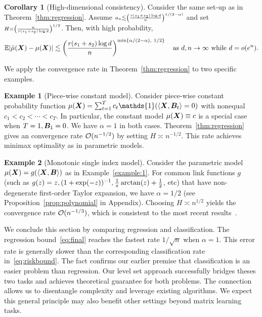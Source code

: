 \documentclass[11pt]{article}
\theoremstyle{plain}
\theoremstyle{definition}
\newtheorem{corollary}{Corollary}
\newtheorem{example}{Example}
\begin{document}
\begin{corollary}[High-dimensional consistency] Consider the same set-up as in Theorem~\ref{thm:regression}. Assume $\scriptstyle a_n \lesssim \left({r(s_1+s_2)\log d \over n}\right)^{1/(2-\alpha)}$ and set $\scriptstyle H\asymp \left({n\over r(s_1+s_2) \log d}\right)^{1/2}$. Then, with high probability,
\begin{equation}\label{eq:final}
\mathbb{E}|\hat \mu(\bm X)- \mu(\bm X)| \lesssim \left({r(s_1+s_2)\log d \over n}\right)^{\min\{\alpha/(2-\alpha),\ 1/2\}} \quad \text{as }d, n\to\infty \text{ while } d=o(e^{n}).
\end{equation}
\end{corollary}
We apply the convergence rate in Theorem~\ref{thm:regression} to two specific examples.

\begin{example}[Piece-wise constant model] Consider piece-wise constant probability function $\mu(\mX)=\sum_{t=1}^T c_t\mathds{1}(\langle \mX, \mB_t \rangle=0)$ with nonequal $c_1< c_2<\cdots < c_T$. In particular, the constant model $\mu(\bm X)\equiv c$ is a special case when $T=1, \bm B_1 = 0$.  We have $\alpha=1$ in both cases. Theorem~\ref{thm:regression} gives an convergence rate $\mathcal{O}(n^{-1/2})$ by setting $H\asymp n^{-1/2}$. This rate achieves minimax optimality as in parametric models. 
\end{example}

\begin{example}[Monotonic single index model]
Consider the parametric model $\mu(\bm X)=g(\langle \bm X,\bm B \rangle)$ as in Example~\ref{example:1}. For common link functions $g$ (such as $g(z)=z, (1+\exp(-z))^{-1}, {1\over \pi}\arctan(z)+{1\over 2}$, etc) that have non-degenerate first-order Taylor expansion, we have $\alpha=1/2$ (see Proposition~\ref{prop:polynomial} in Appendix). Choosing $H\asymp n^{1/2}$ yields the convergence rate $\mathcal{O}(n^{-1/3})$, which is consistent to the most recent results~\citep{balabdaoui2019least}. 
\end{example}

We conclude this section by comparing regression and classification. The regression bound~\eqref{eq:final} reaches the fastest rate $1/\sqrt{n}$ when $\alpha=1$. This error rate is generally slower than the corresponding classification rate in~\eqref{eq:riskbound}. The fact confirms our earlier premise that classification is an easier problem than regression. Our level set approach successfully bridges theses two tasks and achieves theoretical guarantee for both problems. The connection allows us to disentangle complexity and leverage existing algorithms. We expect this general principle may also benefit other settings beyond matrix learning tasks.  
\end{document}
